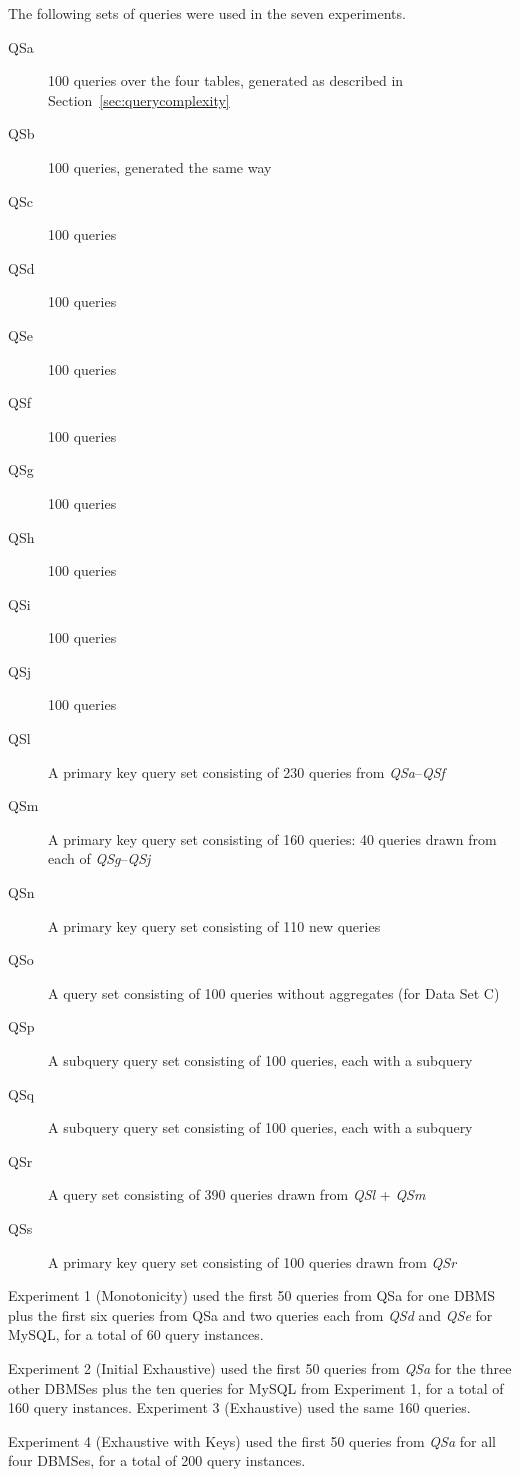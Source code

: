 \documentclass[prodmode,acmtods]{acmsmall}
\begin{document}
The following sets of queries were used in the seven experiments.

\begin{description}
\item[QSa] 100 queries over the four tables, generated as described in Section~\ref{sec:querycomplexity}
\item[QSb] 100 queries, generated the same way
\item[QSc] 100 queries
\item[QSd] 100 queries
\item[QSe] 100 queries
\item[QSf] 100 queries
\item[QSg] 100 queries
\item[QSh] 100 queries
\item[QSi] 100 queries
\item[QSj] 100 queries
\item[QSl] A primary key query set consisting of 230 queries from {\em
  QSa}--{\em QSf}
\item[QSm] A primary key query set consisting of 160 queries: 40 queries
  drawn from each of {\em QSg}--{\em QSj}
\item[QSn] A primary key query set consisting of 110 new queries
\item[QSo] A query set consisting of 100 queries without aggregates (for Data Set C)
\item[QSp] A subquery query set consisting of 100 queries, each with a subquery
\item[QSq] A subquery query set consisting of 100 queries, each with a subquery
\item[QSr] A query set consisting of 390 queries drawn from {\em QSl} + {\em QSm}
\item[QSs] A primary key query set consisting of 100 queries drawn from {\em QSr}
\end{description}

Experiment 1 (Monotonicity) used the first 50 queries from QSa
for one DBMS plus the first six queries from QSa and two queries each from
{\em QSd} and {\em QSe} for MySQL, for a total of 60 query instances.

Experiment 2 (Initial Exhaustive) used the first 50 queries from {\em QSa}
for the three other DBMSes plus the ten queries for MySQL from Experiment 1, for
a total of 160 query instances. Experiment 3 (Exhaustive) used the same 160 queries.

Experiment 4 (Exhaustive with Keys) used the first 50 queries from {\em QSa}
for all four DBMSes, for a total of 200  query instances.
\end{document}
